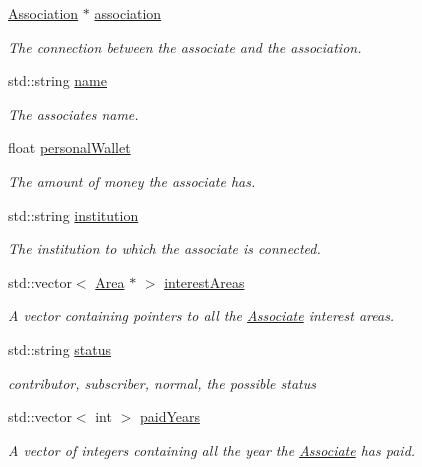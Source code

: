 \begin{DoxyCompactItemize}
\item 
\mbox{\hyperlink{classAssociation}{Association}} $\ast$ \mbox{\hyperlink{classAssociate_a7871837a4c80adb4e39f2f67ae1bfce5}{association}}
\begin{DoxyCompactList}\small\item\em The connection between the associate and the association. \end{DoxyCompactList}\item 
std\+::string \mbox{\hyperlink{classAssociate_ad52875abacf1836cd879b7dffb88d589}{name}}
\begin{DoxyCompactList}\small\item\em The associate\textquotesingle{}s name. \end{DoxyCompactList}\item 
float \mbox{\hyperlink{classAssociate_adc7e2decb409cd226e1508c1c5df3b90}{personal\+Wallet}}
\begin{DoxyCompactList}\small\item\em The amount of money the associate has. \end{DoxyCompactList}\item 
std\+::string \mbox{\hyperlink{classAssociate_a25b82eab07e159a91ebdc64fa4d656ab}{institution}}
\begin{DoxyCompactList}\small\item\em The institution to which the associate is connected. \end{DoxyCompactList}\item 
std\+::vector$<$ \mbox{\hyperlink{classArea}{Area}} $\ast$ $>$ \mbox{\hyperlink{classAssociate_aa4083f0fff7ce7d580f7e2df8f9dbaf2}{interest\+Areas}}
\begin{DoxyCompactList}\small\item\em A vector containing pointers to all the \mbox{\hyperlink{classAssociate}{Associate}} interest areas. \end{DoxyCompactList}\item 
std\+::string \mbox{\hyperlink{classAssociate_aacf79a4e389c7db3d8636b788cb2089f}{status}}
\begin{DoxyCompactList}\small\item\em contributor, subscriber, normal, the possible status \end{DoxyCompactList}\item 
std\+::vector$<$ int $>$ \mbox{\hyperlink{classAssociate_ad7d373d77a5c49eb845e89729962c30d}{paid\+Years}}
\begin{DoxyCompactList}\small\item\em A vector of integers containing all the year the \mbox{\hyperlink{classAssociate}{Associate}} has paid. \end{DoxyCompactList}\item 

\end{DoxyCompactItemize}
